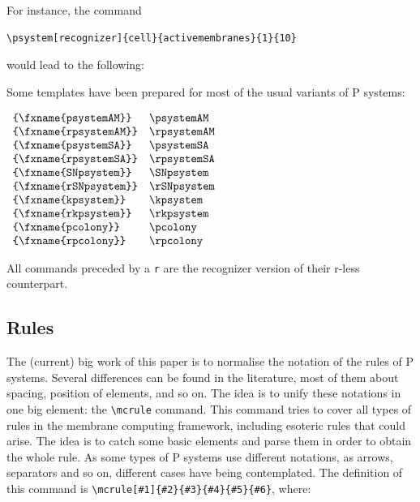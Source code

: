 \documentclass{article}
\begin{document}
For instance, the command
\begin{verbatim}
\psystem[recognizer]{cell}{activemembranes}{1}{10}
\end{verbatim}
would lead to the following:

\begin{center}
\end{center}

Some templates have been prepared for most of the usual variants of P
systems:

$
\begin{array}{ll}
  \verb=\psystemAM= & \psystemAM \\
  \verb=\rpsystemAM= & \rpsystemAM \\
  \verb=\psystemSA= & \psystemSA \\
  \verb=\rpsystemSA= & \rpsystemSA \\
  \verb=\SNpsystem= & \SNpsystem \\
  \verb=\rSNpsystem= & \rSNpsystem \\
  \verb=\kpsystem= & \kpsystem \\
  \verb=\rkpsystem= & \rkpsystem \\
  \verb=\pcolony= & \pcolony \\
  \verb=\rpcolony= & \rpcolony \\
\end{array}
$

All commands preceded by a \verb=r= are the recognizer version of
their r-less counterpart.

\subsection{Rules}
\label{sec:rules}

The (current) big work of this paper is to normalise the notation of
the rules of P systems. Several differences can be found in the
literature, most of them about spacing, position of elements, and so
on. The idea is to unify these notations in one big element: the
\verb=\mcrule= command. This command tries to cover all types of rules
in the membrane computing framework, including esoteric rules that
could arise. The idea is to catch some basic elements and parse them
in order to obtain the whole rule. As some types of P systems use
different notations, as arrows, separators and so on, different cases
have being contemplated. The definition of this command is
\verb=\mcrule[#1]{#2}{#3}{#4}{#5}{#6}=, where:
\end{document}
